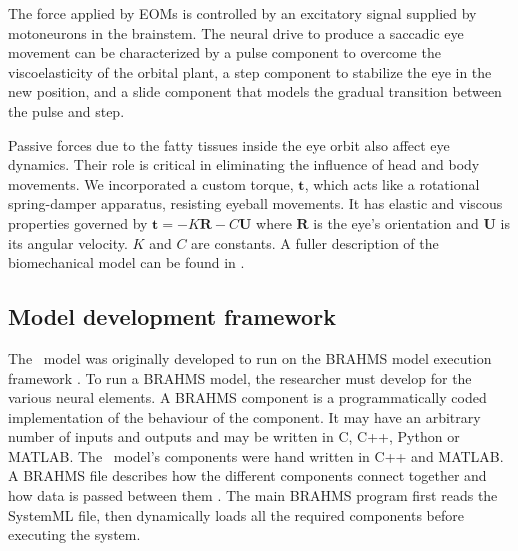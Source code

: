 \documentclass{frontiersSCNS}
\begin{document}

The force applied by EOMs is controlled by an excitatory signal
supplied by motoneurons in the brainstem. The neural drive to produce
a saccadic eye movement can be characterized by a pulse component to
overcome the viscoelasticity of the orbital plant, a step component to
stabilize the eye in the new position, and a slide component that
models the gradual transition between the pulse and step.

Passive forces due to the fatty tissues inside the eye orbit also
affect eye dynamics. Their role is critical in eliminating the
influence of head and body movements. We incorporated a custom torque,
$\mathbf{t}$, which acts like a rotational spring-damper apparatus,
resisting eyeball movements. It has elastic and viscous properties
governed by $\mathbf{t} = -K\mathbf{R}-C\mathbf{U}$ where $\mathbf{R}$
is the eye's orientation and $\mathbf{U}$ is its angular velocity. $K$
and $C$ are constants. A fuller description of the biomechanical model
can be found in \cite{papapavlou_physics-based_2014}.

\subsection{Model development framework} \label{sec:methods:framework}

The \ccg~model was originally developed to run on the BRAHMS model
execution framework
\citep{mitchinson_brahms:_2010,mitchinson_brahms_2015}. To run a
BRAHMS model, the researcher must develop  for
the various neural elements. A BRAHMS component is a programmatically
coded implementation of the behaviour of the component. It may have an
arbitrary number of inputs and outputs and may be written in C, C++,
Python or MATLAB. The \ccg~model's components were hand written in C++
and MATLAB. A BRAHMS  file describes how the different
components connect together and how data is passed between them
\citep{mitchinson_brahms:_2010}. The main BRAHMS program first
reads the SystemML file, then dynamically loads all the required
components before executing the system.
\end{document}
